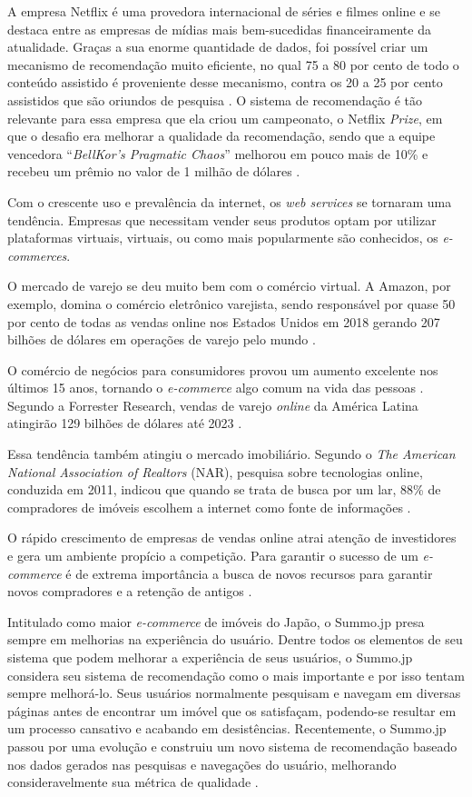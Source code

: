A empresa Netflix é uma provedora internacional de séries e filmes online e se destaca entre as empresas de mídias mais bem-sucedidas financeiramente da atualidade. Graças a sua enorme quantidade de dados, foi possível criar um mecanismo de recomendação muito eficiente, no qual 75 a 80 por cento de todo o conteúdo assistido é proveniente desse mecanismo, contra os 20 a 25 por cento assistidos que são oriundos de pesquisa \cite{Kleinman:2014}. O sistema de recomendação é tão relevante para essa empresa que ela criou um campeonato, o Netflix \textit{Prize}, em que o desafio era melhorar a qualidade da recomendação, sendo que a equipe vencedora “\textit{BellKor's Pragmatic Chaos}” melhorou em pouco mais de 10\% e recebeu um prêmio no valor de 1 milhão de dólares \cite{netflixprize:2009}.

Com o crescente uso e prevalência da internet, os \textit{web services} se tornaram uma tendência. Empresas que necessitam vender seus produtos optam por utilizar plataformas virtuais, virtuais, ou como mais popularmente são conhecidos, os \textit{e-commerces}.

O mercado de varejo se deu muito bem com o comércio virtual. A Amazon, por exemplo, domina o comércio eletrônico varejista, sendo responsável por quase 50 por cento de todas as vendas online nos Estados Unidos em 2018 gerando 207 bilhões de dólares em operações de varejo pelo mundo \cite{JAKE:2019}.

O comércio de negócios para consumidores provou um aumento excelente nos últimos 15 anos, tornando o \textit{e-commerce} algo comum na vida das pessoas \cite{Jiang:2015}. Segundo a Forrester Research, vendas de varejo \textit{online} da América Latina atingirão 129 bilhões de dólares até 2023 \cite{Forrester:2019}.

Essa tendência também atingiu o mercado imobiliário. Segundo o \textit{The American National Association of Realtors} (NAR), pesquisa sobre tecnologias online, conduzida em 2011, indicou que quando se trata de busca por um lar, 88\% de compradores de imóveis escolhem a internet como fonte de informações \cite{Yuan:2013}.

O rápido crescimento de empresas de vendas online atrai atenção de investidores e gera um ambiente propício a competição. Para garantir o sucesso de um \textit{e-commerce} é de extrema importância a busca de novos recursos para garantir novos compradores e a retenção de antigos \cite{Jiang:2015}. 

Intitulado como maior \textit{e-commerce} de imóveis do Japão, o Summo.jp presa sempre em melhorias na experiência do usuário. Dentre todos os elementos de seu sistema que podem melhorar a experiência de seus usuários, o Summo.jp considera seu sistema de recomendação como o mais importante e por isso tentam sempre melhorá-lo. Seus usuários normalmente pesquisam e navegam em diversas páginas antes de encontrar um imóvel que os satisfaçam, podendo-se resultar em um processo cansativo e acabando em desistências. Recentemente, o Summo.jp passou por uma evolução e construiu um novo
sistema de recomendação baseado nos dados gerados nas pesquisas e navegações do usuário, melhorando consideravelmente sua métrica de qualidade \cite{Summo:2017}.

